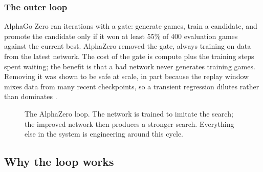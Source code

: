 \subsubsection{The outer loop}

AlphaGo Zero ran iterations with a gate: generate games, train a candidate, and
promote the candidate only if it won at least 55\% of 400 evaluation games
against the current best. AlphaZero removed the gate, always training on data
from the latest network. The cost of the gate is compute plus the training steps
spent waiting; the benefit is that a bad network never generates training games.
Removing it was shown to be safe at scale, in part because the replay window
mixes data from many recent checkpoints, so a transient regression dilutes
rather than dominates \citep{tian2019elf,wu2019katago}.

\begin{figure}[t]
\centering
{}
\caption{The AlphaZero loop. The network is trained to imitate the search; the
improved network then produces a stronger search. Everything else in the system
is engineering around this cycle.}
\label{fig:loop}
\end{figure}

\subsection{Why the loop works}
\label{sec:alphazero-why}

